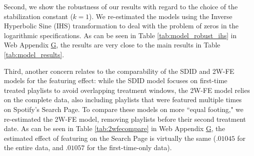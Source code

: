 Second, we show the robustness of our results with regard to the choice of the stabilization constant ($k=1$). We re-estimated the models using the Inverse Hyperbolic Sine (IHS) transformation to deal with the problem of zeros in the logarithmic specifications. As can be seen in Table \ref{tab:model_robust_ihs} in Web Appendix \hyperref[rob_checks]{G}, the results are very close to the main results in Table \ref{tab:model_results}.

Third, another concern relates to the comparability of the SDID and 2W-FE models for the featuring effect: while the SDID model focuses on first-time treated playlists to avoid overlapping treatment windows, the 2W-FE model relies on the complete data, also including playlists that were featured multiple times on Spotify's Search Page. To compare these models on more ``equal footing," we re-estimated the 2W-FE model, removing playlists before their second treatment date. As can be seen in Table \ref{tab:2wfecompare} in Web Appendix \hyperref[rob_checks]{G}, the estimated effect of featuring on the Search Page is virtually the same ($.01045$ for the entire data, and $.01057$ for the first-time-only data).



